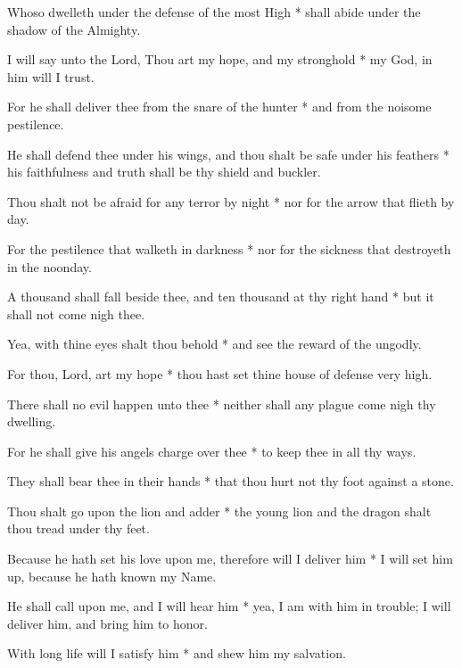 Whoso dwelleth under the defense of the most High * shall abide under the shadow of the Almighty.

I will say unto the Lord, Thou art my hope, and my stronghold * my God, in him will I trust.

For he shall deliver thee from the snare of the hunter * and from the noisome pestilence.

He shall defend thee under his wings, and thou shalt be safe under his feathers * his faithfulness and truth shall be thy shield and buckler.

Thou shalt not be afraid for any terror by night * nor for the arrow that flieth by day.

For the pestilence that walketh in darkness * nor for the sickness that destroyeth in the noonday.

A thousand shall fall beside thee, and ten thousand at thy right hand * but it shall not come nigh thee.

Yea, with thine eyes shalt thou behold * and see the reward of the ungodly.

For thou, Lord, art my hope * thou hast set thine house of defense very high.

There shall no evil happen unto thee * neither shall any plague come nigh thy dwelling.

For he shall give his angels charge over thee * to keep thee in all thy ways.

They shall bear thee in their hands * that thou hurt not thy foot against a stone.

Thou shalt go upon the lion and adder * the young lion and the dragon shalt thou tread under thy feet.

Because he hath set his love upon me, therefore will I deliver him * I will set him up, because he hath known my Name.

He shall call upon me, and I will hear him * yea, I am with him in trouble; I will deliver him, and bring him to honor.

With long life will I satisfy him * and shew him my salvation.